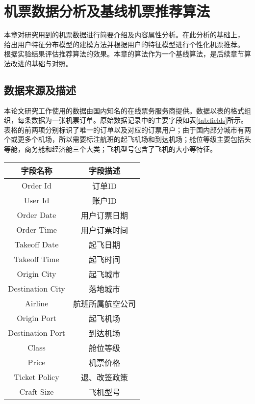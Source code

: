 
\chapter{机票数据分析及基线机票推荐算法}
\label{chap:baseline}
本章对研究用到的机票数据进行简要介绍及内容属性分析。在此分析的基础上，
给出用户特征分布模型的建模方法并根据用户的特征模型进行个性化机票推荐。
根据实验结果评估推荐算法的效果。本章的算法作为一个基线算法，是后续章节算法改进的基础与对照。

\section{数据来源及描述}
本论文研究工作使用的数据由国内知名的在线票务服务商提供。数据以表的格式组织，每条数据为一张机票订单。原始数据记录中的主要字段如表\ref{tab:fields}所示。
表格的前两项分别标识了唯一的订单以及对应的订票用户；由于国内部分城市有两个或更多个机场，所以需要标注航班的起飞机场和到达机场；舱位等级主要包括头等舱，商务舱和经济舱三个大类；飞机型号包含了飞机的大小等特征。

\begin{table}[!hpb]
  \centering
  \begin{tabular}{|c|c|} \hline 
    字段名称 & 字段描述\\ \hline
    Order Id & 订单ID \\ \hline
    User Id &  账户ID \\ \hline
    Order Date & 用户订票日期 \\ \hline
    Order Time & 用户订票时间 \\ \hline
    Takeoff Date & 起飞日期 \\ \hline
    Takeoff Time & 起飞时间 \\ \hline
    Origin City & 起飞城市 \\ \hline
    Destination City & 落地城市 \\ \hline
    Airline & 航班所属航空公司 \\ \hline
    Origin Port & 起飞机场 \\ \hline
    Destination Port & 到达机场 \\ \hline
    Class & 舱位等级 \\ \hline
    Price & 机票价格 \\ \hline
    Ticket Policy & 退、改签政策 \\ \hline
    Craft Size & 飞机型号 \\ \hline
  \end{tabular}
\end{table}

